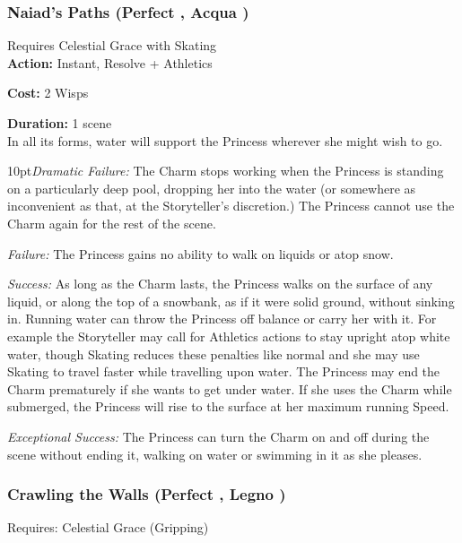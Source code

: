 \subsubsection*{Naiad's Paths (Perfect \textbullet\textbullet\textbullet, Acqua \textbullet\textbullet)}
\noindent Requires Celestial Grace with Skating\\

\noindent \textbf{Action:} Instant, Resolve + Athletics

\noindent \textbf{Cost:} 2 Wisps

\noindent \textbf{Duration:} 1 scene\\

\noindent In all its forms, water will support the Princess wherever she might wish to go.

\begin{myindentpar}{10pt}\emph{Dramatic Failure:} The Charm stops working when the Princess is standing on a particularly deep pool, dropping her into the water (or somewhere as inconvenient as that, at the Storyteller's discretion.) The Princess cannot use the Charm again for the rest of the scene.
 
\emph{Failure:} The Princess gains no ability to walk on liquids or atop snow.

\emph{Success:} As long as the Charm lasts, the Princess walks on the surface of any liquid, or along the top of a snowbank, as if it were solid ground, without sinking in. Running water can throw the Princess off balance or carry her with it. For example the Storyteller may call for Athletics actions to stay upright atop white water, though Skating reduces these penalties like normal and she may use Skating to travel faster while travelling upon water. The Princess may end the Charm prematurely if she wants to get under water. If she uses the Charm while submerged, the Princess will rise to the surface at her maximum running Speed.

\emph{Exceptional Success:} The Princess can turn the Charm on and off during the scene without ending it, walking on water or swimming in it as she pleases.\end{myindentpar}

\subsubsection*{Crawling the Walls (Perfect \textbullet\textbullet\textbullet, Legno \textbullet\textbullet)}

\noindent Requires: Celestial Grace (Gripping)

